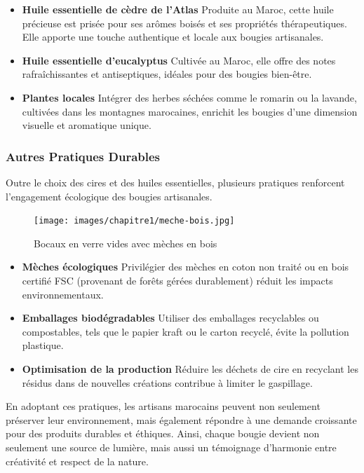 \documentclass[11pt,fleqn,onecolumn,oneside]{book}
\begin{document}
\begin{itemize}
    \item \textbf{Huile essentielle de cèdre de l’Atlas} Produite au Maroc, cette huile précieuse est prisée pour ses arômes boisés et ses propriétés thérapeutiques. Elle apporte une touche authentique et locale aux bougies artisanales.
    \item \textbf{Huile essentielle d’eucalyptus} Cultivée au Maroc, elle offre des notes rafraîchissantes et antiseptiques, idéales pour des bougies bien-être.
    \item \textbf{Plantes locales} Intégrer des herbes séchées comme le romarin ou la lavande, cultivées dans les montagnes marocaines, enrichit les bougies d’une dimension visuelle et aromatique unique.
\end{itemize}

\subsubsection*{Autres Pratiques Durables}

Outre le choix des cires et des huiles essentielles, plusieurs pratiques renforcent l’engagement écologique des bougies artisanales.

\begin{figure}[htbp]
    \centering
    \texttt{[image: images/chapitre1/meche-bois.jpg]}
    \caption{Bocaux en verre vides avec mèches en bois}
    \label{fig:cedrus_atlantica}
\end{figure}

\begin{itemize}
    \item \textbf{Mèches écologiques} Privilégier des mèches en coton non traité ou en bois certifié FSC (provenant de forêts gérées durablement) réduit les impacts environnementaux.
    \item \textbf{Emballages biodégradables} Utiliser des emballages recyclables ou compostables, tels que le papier kraft ou le carton recyclé, évite la pollution plastique.
    \item \textbf{Optimisation de la production} Réduire les déchets de cire en recyclant les résidus dans de nouvelles créations contribue à limiter le gaspillage.
\end{itemize}

\begin{remark}
En adoptant ces pratiques, les artisans marocains peuvent non seulement préserver leur environnement, mais également répondre à une demande croissante pour des produits durables et éthiques. Ainsi, chaque bougie devient non seulement une source de lumière, mais aussi un témoignage d’harmonie entre créativité et respect de la nature.
\end{remark}
\end{document}
